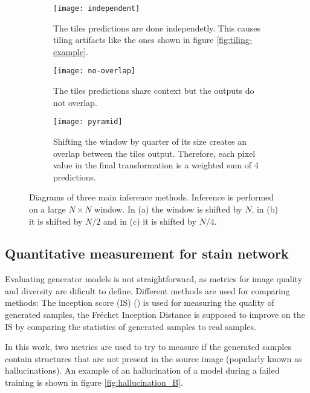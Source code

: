 \documentclass[../main.tex]{subfiles}
\begin{document}
\begin{figure}
\centering
\captionsetup{width=.8\linewidth}

\begin{subfigure}{.8\textwidth}
\centering
\captionsetup{width=.8\linewidth}
\texttt{[image: independent]}
\caption{The tiles predictions are done independetly. This causes tiling artifacts
like the ones shown in figure \ref{fig:tiling-example}.}
\label{fig:independent-diagram}
\end{subfigure}

\begin{subfigure}{.5\textwidth}
\centering
\captionsetup{width=.8\linewidth}
\texttt{[image: no-overlap]}
\caption{The tiles predictions share context but the outputs do not overlap.}
\label{fig:no-overlap-diagram}
\end{subfigure}%
\begin{subfigure}{.5\textwidth}
\centering
\texttt{[image: pyramid]}
\caption{Shifting the window by quarter of its size creates an overlap between
the tiles output. Therefore, each pixel value in the final transformation is a
weighted sum of 4 predictions.}
\label{fig:pyramid-diagram}
\end{subfigure}

\caption{Diagrams of three main inference methods. Inference is performed on a
large $N \times N$ window. In (a) the window is shifted by $N$, in (b) it is
shifted by $N / 2$ and in (c) it is shifted by $N/4$.}
\label{fig:inference-diagrams}
\end{figure}

\subsection{Quantitative measurement for stain network}
Evaluating generator models is not straightforward, as metrics for image
quality and diversity are dificult to define. Different methods are used
for comparing methods: The inception score (IS)
(\cite{DBLP:journals/corr/SalimansGZCRC16}) is used for measuring the quality
of generated samples, the Fréchet Inception Distance is supposed to improve on
the IS by comparing the statistics of generated samples to real samples.

In this work, two metrics are used to try to measure if the generated
samples contain structures that are not present in the source image
(popularly known as hallucinations). An example of an hallucination of a 
model during a failed training is shown in figure \ref{fig:hallucination_B}.
\end{document}
